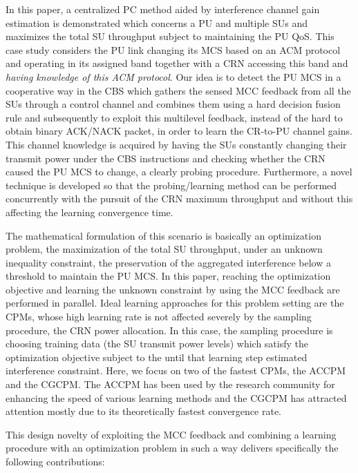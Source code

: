 \documentclass[journal]{IEEEtran}
\begin{document}
In this paper, a centralized PC method aided by interference channel gain estimation is demonstrated which concerns a PU and multiple SUs and maximizes the total SU throughput subject to maintaining the PU QoS. This case study considers the PU link changing its MCS based on an ACM protocol and operating in its assigned band together with a CRN accessing this band and \textit{having knowledge of this ACM protocol}. Our idea is to detect the PU MCS in a cooperative way in the CBS which gathers the sensed MCC feedback from all the SUs through a control channel and combines them using a hard decision fusion rule and subsequently to exploit this multilevel feedback, instead of the hard to obtain binary ACK/NACK packet, in order to learn the CR-to-PU channel gains. This channel knowledge is acquired by having the SUs constantly changing their transmit power under the CBS instructions and checking whether the CRN caused the PU MCS to change, a clearly probing procedure. Furthermore, a novel technique is developed so that the probing/learning method can be performed concurrently with the pursuit of the CRN maximum throughput and without this affecting the learning convergence time.

The mathematical formulation of this scenario is basically an optimization problem, the maximization of the total SU throughput, under an unknown inequality constraint, the preservation of the aggregated interference below a threshold to maintain the PU MCS. In this paper, reaching the optimization objective and learning the unknown constraint by using the MCC feedback are performed in parallel. Ideal learning approaches for this problem setting are the CPMs, whose high learning rate is not affected severely by the sampling procedure, the CRN power allocation. In this case, the sampling procedure is choosing training data (the SU transmit power levels) which satisfy the optimization objective subject to the until that learning step estimated interference constraint. Here, we focus on two of the fastest CPMs, the ACCPM and the CGCPM. The ACCPM has been used by the research community for enhancing the speed of various learning methods and the CGCPM has attracted attention mostly due to its theoretically fastest convergence rate.

This design novelty of exploiting the MCC feedback and combining a learning procedure with an optimization problem in such a way delivers specifically the following contributions:
\end{document}
